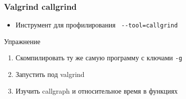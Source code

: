 \begin{frame}[fragile]
 \frametitle{Valgrind callgrind}
 \begin{itemize}
  \item Инструмент для профилирования \verb+ --tool=callgrind+
 \end{itemize}
 \begin{center}
  Упражнение
 \end{center}
 \begin{enumerate}
  \item Скомпилировать ту же самую программу с ключами \verb+-g+
  \item Запустить под valgrind
  \item Изучить callgraph и относительное время в функциях
 \end{enumerate}
\end{frame}
